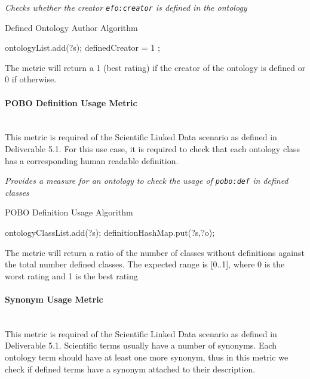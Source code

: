 \begin{mdframed}[style=metricdefinition]
\emph{Checks whether the creator \texttt{efo:creator} is defined in the ontology}
\end{mdframed}

\begin{algorithm}
\caption{Defined Ontology Author Algorithm}
\begin{algorithmic}[1]
 ontologyList.add(?s); \EndIf
{} definedCreator = 1 ; \EndIf
\EndProcedure
\end{algorithmic}
\end{algorithm}

The metric will return a 1 (best rating) if the creator of the ontology is defined or 0 if otherwise.

\paragraph{POBO Definition Usage Metric}~\\ 
This metric is required of the Scientific Linked Data scenario as defined in Deliverable 5.1.
For this use case, it is required to check that each ontology class has a corresponding human readable definition.

\begin{mdframed}[style=metricdefinition]
\emph{Provides a measure for an ontology to check the usage of \texttt{pobo:def} in defined classes}
\end{mdframed}

\begin{algorithm}
\caption{POBO Definition Usage Algorithm}
\begin{algorithmic}[1]
 ontologyClassList.add(?s); \EndIf
{} 
\State definitionHashMap.put(?s,?o);
\EndIf
\EndProcedure
\end{algorithmic}
\end{algorithm}

The metric will return a ratio of the number of classes without definitions against the total number defined classes. The expected range is [0..1], where 0 is the worst rating and 1 is the best rating

\paragraph{Synonym Usage Metric}~\\ 
This metric is required of the Scientific Linked Data scenario as defined in Deliverable 5.1.
Scientific terms usually have a number of synonyms.
Each ontology term should have at least one more synonym, thus in this metric we check if defined terms have a synonym attached to their description.

